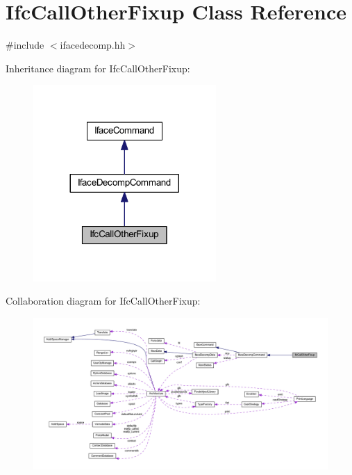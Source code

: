 \hypertarget{class_ifc_call_other_fixup}{}\section{Ifc\+Call\+Other\+Fixup Class Reference}
\label{class_ifc_call_other_fixup}


{\ttfamily \#include $<$ifacedecomp.\+hh$>$}



Inheritance diagram for Ifc\+Call\+Other\+Fixup\+:
\nopagebreak
\begin{figure}[H]
\begin{center}
\leavevmode
\includegraphics[width=197pt]{class_ifc_call_other_fixup__inherit__graph}
\end{center}
\end{figure}


Collaboration diagram for Ifc\+Call\+Other\+Fixup\+:
\nopagebreak
\begin{figure}[H]
\begin{center}
\leavevmode
\includegraphics[width=350pt]{class_ifc_call_other_fixup__coll__graph}
\end{center}
\end{figure}
